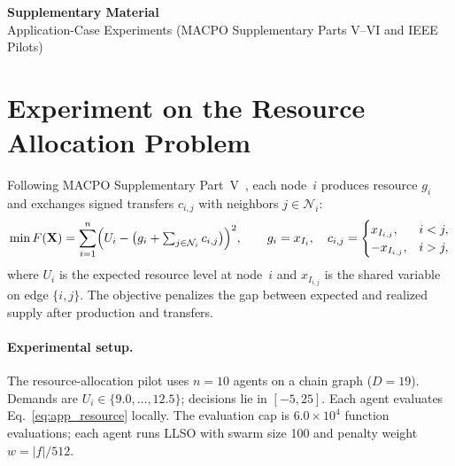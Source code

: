 \clearpage
\onecolumn
\FloatBarrier
\begin{center}
{\Large\bfseries Supplementary Material}\\[0.4em]
{\normalsize Application-Case Experiments (MACPO Supplementary Parts V--VI and IEEE Pilots)}
\end{center}
\vspace{0.6em}
\FloatBarrier
\setcounter{section}{4}
\renewcommand{\thesection}{\Roman{section}}

\section{Experiment on the Resource Allocation Problem}\label{app:resource}
Following MACPO Supplementary Part~V~\cite{ref_macpo}, each node~$i$ produces resource $g_i$ and exchanges signed transfers $c_{i,j}$ with neighbors $j\in\mathcal{N}_i$:
\begin{equation}
\min F(\mathbf{X})=\sum_{i=1}^{n}\Bigl(U_i-\bigl(g_i+\textstyle\sum_{j\in\mathcal{N}_i}c_{i,j}\bigr)\Bigr)^2,
\qquad
g_i=x_{I_i},\quad
c_{i,j}=\begin{cases}
x_{I_{i,j}}, & i<j,\\
-x_{I_{i,j}}, & i>j,
\end{cases}
\label{eq:app_resource}
\end{equation}
where $U_i$ is the expected resource level at node~$i$ and $x_{I_{i,j}}$ is the shared variable on edge $\{i,j\}$. The objective penalizes the gap between expected and realized supply after production and transfers.

\paragraph{Experimental setup.}
The resource-allocation pilot uses $n{=}10$ agents on a chain graph ($D{=}19$). Demands are $U_i\in\{9.0,\ldots,12.5\}$; decisions lie in $[-5,25]$. Each agent evaluates Eq.~\eqref{eq:app_resource} locally. The evaluation cap is $6.0\times10^4$ function evaluations; each agent runs LLSO with swarm size 100 and penalty weight $w=|f|/512$.

